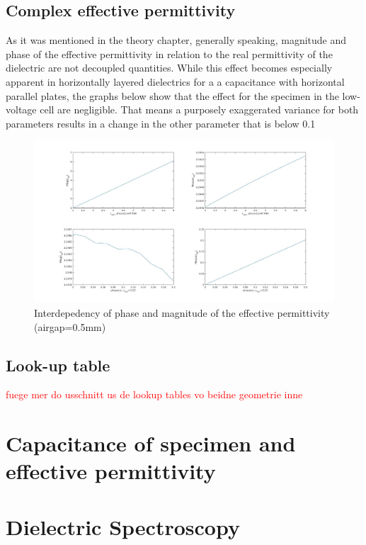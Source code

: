 \subsection{Complex effective permittivity}
As it was mentioned in the theory chapter, generally speaking, magnitude and phase of the effective permittivity in relation to the
real permittivity of the dielectric are not decoupled quantities. While this effect becomes especially apparent in horizontally layered dielectrics for a
a capacitance with horizontal parallel plates, the graphs below show that the effect for the specimen in the low-voltage cell are negligible. That means a purposely exaggerated variance for both parameters
results in a change in the other parameter that is below 0.1%

\begin{figure}[htbp]
	\centering
	\includegraphics[scale=0.3]{figures/Results/Complex/complex_permittivity_specimen}		
	\caption[Kurze Abbildungsbeschreibung]{Interdepedency of phase and magnitude of the effective permittivity (airgap=0.5mm) } 
	\label{fig.waveforms}
\end{figure}




\subsection{Look-up table}


\textcolor{red}{fuege mer do usschnitt us de lookup tables vo beidne geometrie inne}


\section{Capacitance of specimen and effective permittivity}



\section{Dielectric Spectroscopy}

